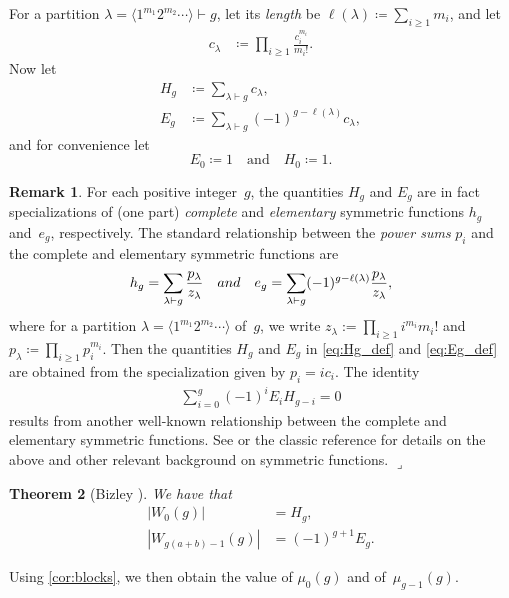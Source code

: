 \documentclass[11pt]{article}
\newcommand{\lrcornerqed}[0]{}
\renewcommand{\lrcornerqed}[0]{\hfill $\lrcorner$} %
\newtheorem{thm}{Theorem}[section] %
\theoremstyle{definition} %
\numberwithin{equation}{section}
\newtheorem{remark}[thm]{Remark}
\begin{document}
    For a partition $\lambda=\langle 1^{m_1}2^{m_2} \cdots \rangle\vdash g$, let its \textit{length} be $\ell(\lambda) \coloneqq \sum_{i\ge 1} m_i$, and let
    \begin{align}
        c_\lambda &\coloneqq \prod_{i\ge 1} \frac{c_i^{m_i}}{m_i!}.
        \label{def:C_lambda}
    \end{align}
    Now let
        \begin{align}
        {H}_g &\coloneqq \sum_{\lambda \vdash g}  c_\lambda,
        \label{eq:Hg_def}\\
        {E}_g &\coloneqq \sum_{\lambda \vdash g} (-1)^{g-\ell(\lambda)} c_\lambda,
        \label{eq:Eg_def}
    \end{align}
and for convenience let
\begin{equation}\label{eq:E0H0}
   E_0 \coloneqq 1 \quad \mbox{and} \quad H_0 \coloneqq 1.
\end{equation}
\begin{remark}
\label{rem:H_and_E_vs_symmetric_functions}
    For each positive integer~$g$, the quantities $H_g$ and $E_g$ are in fact specializations of (one part) \textit{complete} and \textit{elementary} symmetric functions $h_g$ and~$e_g$, respectively. The standard relationship between the \textit{power sums} $p_i$ and the complete and elementary symmetric functions are 
    \begin{align}
        h_g = \sum_{\lambda \vdash g} \frac{p_\lambda}{z_\lambda}\quad \textnormal{ and }\quad e_g = \sum_{\lambda \vdash g} (-1)^{g-\ell(\lambda)}\frac{p_\lambda}{z_\lambda},
    \end{align}
    where for a partition $\lambda = \langle 1^{m_1} 2^{m_2} \cdots \rangle$ of~$g$, we write $z_\lambda := \prod_{i \ge 1} i^{m_i} m_i!$ and $p_\lambda \coloneqq \prod_{i \ge 1} p_i^{m_i}$.  Then the quantities $H_g$ and $E_g$ in \eqref{eq:Hg_def} and \eqref{eq:Eg_def} are obtained from the specialization given by $p_i = ic_i$. The identity
    \begin{align}
    \label{eq:symfuncrel}
        \sum_{i=0}^g (-1)^i E_i H_{g-i} = 0
    \end{align}
    results from another well-known relationship between the complete and elementary symmetric functions.
    See \cite{aigner} or the classic reference \cite{macdonald} for details on the above and other relevant background on symmetric functions.
    \lrcornerqed
    \end{remark}

\begin{thm}[Bizley \cite{biz}]
\label{thm:actual_bizley}
    We have that
    \begin{align}
        |W_0(g)| &= {H}_g, \label{eq:biz:weak}\\
        |W_{g(a+b)-1}(g)| &= (-1)^{g+1}{E}_g. 
    \end{align}
\end{thm}
Using \cref{cor:blocks}, we then obtain the value of $\mu_0(g)$ and of~$\mu_{g-1}(g)$.
\end{document}
